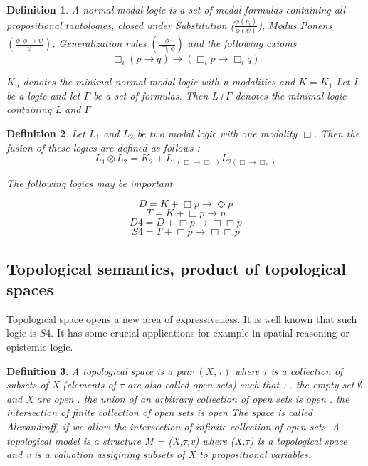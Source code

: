 \documentclass[12pt, a4paper]{scrartcl}
\newtheorem{definition}{Definition}[subsection]
\begin{document}
\begin{definition}
A normal modal logic is a set of modal formulas containing all propositional tautologies,
closed under Substitution ($\frac{\phi(p_i)}{\phi(\psi)}$), Modus Ponens 
$(\frac{\phi, \phi \rightarrow \psi}{\psi})$, Generalization rules $(\frac{\phi}{\Box_i \phi})$
and the following axioms 
$$ \Box_i (p \rightarrow q) \rightarrow (\Box_i p \rightarrow \Box_i q)$$

$K_n$ denotes the minimal normal modal logic with n modalities and $K = K_1$
Let L be a logic and let $\Gamma$ be a set of formulas. Then L+$\Gamma$ denotes 
the minimal logic containing L and $\Gamma$
\end{definition}


\begin{definition}
Let $L_1$ and $L_2$ be two modal logic with one modality $\Box$. Then the fusion of these 
logics are defined as follows :
$$ L_1 \otimes L_2 = K_2 + L_{1(\Box \rightarrow \Box_1)} L_{2(\Box \rightarrow \Box_2)} $$

The following logics may be important 

$$D = K + \Box p \rightarrow \Diamond p$$
$$T = K + \Box p \rightarrow p$$
$$D4 = D + \Box p \rightarrow \Box \Box p$$
$$S4 = T + \Box p \rightarrow \Box \Box p$$   
\end{definition}

\clearpage

\subsection{Topological semantics, product of topological spaces}
Topological space opens a new area of expressiveness. It is well known that such logic is $S4$. It has some crucial applications for example in spatial reasoning or epistemic logic.

\begin{definition}
    A topological space is a pair $(X, \tau)$ where $\tau$ is a collection of subsets of X (elements of $\tau$ are also called open sets) such that : 
    \newline
    . the empty set $\emptyset $ and X are open
    . the union of an arbitrary collection of open sets is open
    . the intersection of finite collection of open sets is open
    \newline
    \newline
    The space is called Alexandroff, if we allow the intersection of infinite collection of open sets.
    A topological model is a structure M = (X,$\tau$,v) where (X,$\tau$) is a topological space
    and v is a valuation assigining subsets of X to propositional variables. 
        
\end{definition}
\end{document}
